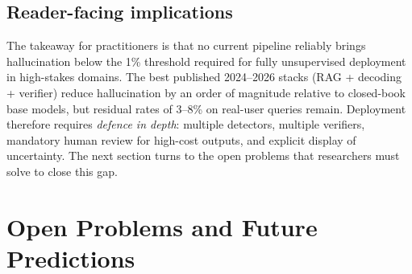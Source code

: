 \documentclass{article}
\begin{document}
\subsection{Reader-facing implications}\label{reader-facing-implications}

The takeaway for practitioners is that no current pipeline reliably brings hallucination below the 1\% threshold required for fully unsupervised deployment in high-stakes domains. The best published 2024--2026 stacks (RAG + decoding + verifier) reduce hallucination by an order of magnitude relative to closed-book base models, but residual rates of 3--8\% on real-user queries remain. Deployment therefore requires \emph{defence in depth}: multiple detectors, multiple verifiers, mandatory human review for high-cost outputs, and explicit display of uncertainty. The next section turns to the open problems that researchers must solve to close this gap.

\section{Open Problems and Future Predictions}\label{open-problems-and-future-predictions}
\end{document}
